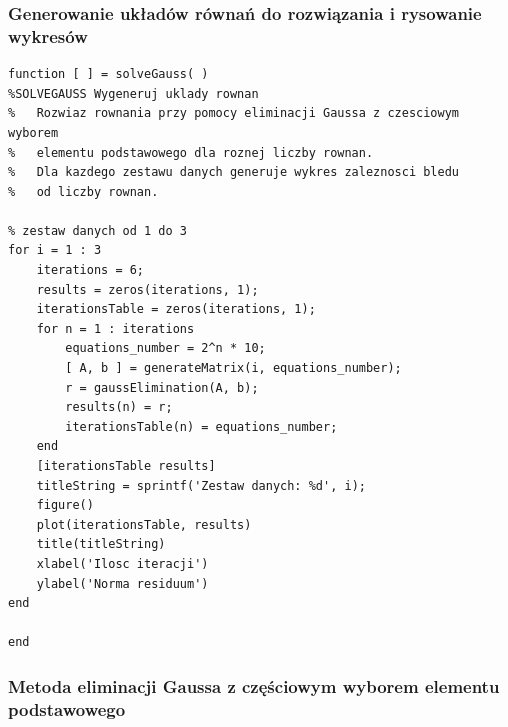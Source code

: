 \documentclass[11pt]{article} %
\begin{document}
\subsubsection{Generowanie układów równań do rozwiązania i rysowanie wykresów}

\begin{verbatim}
function [ ] = solveGauss( )
%SOLVEGAUSS Wygeneruj uklady rownan
%   Rozwiaz rownania przy pomocy eliminacji Gaussa z czesciowym wyborem
%   elementu podstawowego dla roznej liczby rownan.
%   Dla kazdego zestawu danych generuje wykres zaleznosci bledu
%   od liczby rownan.

% zestaw danych od 1 do 3
for i = 1 : 3
    iterations = 6;
    results = zeros(iterations, 1);
    iterationsTable = zeros(iterations, 1);
    for n = 1 : iterations
        equations_number = 2^n * 10;
        [ A, b ] = generateMatrix(i, equations_number);
        r = gaussElimination(A, b);
        results(n) = r;
        iterationsTable(n) = equations_number;
    end
    [iterationsTable results]
    titleString = sprintf('Zestaw danych: %d', i);
    figure()
    plot(iterationsTable, results)
    title(titleString)
    xlabel('Ilosc iteracji')
    ylabel('Norma residuum')
end

end

\end{verbatim}

\subsubsection{Metoda eliminacji Gaussa z częściowym wyborem elementu podstawowego}
\end{document}
